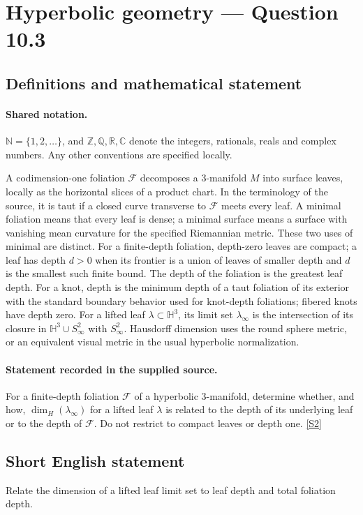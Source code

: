 \documentclass[11pt]{article}
\newcommand{\sref}[2]{\hyperlink{source:#1:#2}{[S#2]}}
\begin{document}
\section{Hyperbolic geometry — Question 10.3}\label{statement}

\subsection{Definitions and mathematical statement}

\paragraph{Shared notation.}$\mathbb N=\{1,2,\ldots\}$, and $\mathbb Z,\mathbb Q,\mathbb R,\mathbb C$ denote the integers, rationals, reals and complex numbers. Any other conventions are specified locally.


A codimension-one foliation $\mathcal F$ decomposes a $3$-manifold $M$ into surface leaves, locally as the horizontal slices of a product chart. In the terminology of the source, it is taut if a closed curve transverse to $\mathcal F$ meets every leaf. A minimal foliation means that every leaf is dense; a minimal surface means a surface with vanishing mean curvature for the specified Riemannian metric. These two uses of minimal are distinct. For a finite-depth foliation, depth-zero leaves are compact; a leaf has depth $d>0$ when its frontier is a union of leaves of smaller depth and $d$ is the smallest such finite bound. The depth of the foliation is the greatest leaf depth. For a knot, depth is the minimum depth of a taut foliation of its exterior with the standard boundary behavior used for knot-depth foliations; fibered knots have depth zero. For a lifted leaf $\lambda\subset\mathbb H^3$, its limit set $\lambda_\infty$ is the intersection of its closure in $\mathbb H^3\cup S^2_\infty$ with $S^2_\infty$. Hausdorff dimension uses the round sphere metric, or an equivalent visual metric in the usual hyperbolic normalization.
\paragraph{Statement recorded in the supplied source.}
For a finite-depth foliation $\mathcal F$ of a hyperbolic $3$-manifold, determine whether, and how, $\dim_H(\lambda_\infty)$ for a lifted leaf $\lambda$ is related to the depth of its underlying leaf or to the depth of $\mathcal F$. Do not restrict to compact leaves or depth one. \sref{statement}{2}
\subsection{Short English statement}
Relate the dimension of a lifted leaf limit set to leaf depth and total foliation depth.
\end{document}
